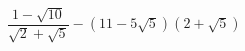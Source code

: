 \begin{ex}[type=calculate]
	\begin{condition}
		\( \dfrac{1-\sqrt{10}}{\sqrt{2}+\sqrt{5}}-(11-5\sqrt{5})(2+\sqrt{5}) \)
	\end{condition}
\end{ex}